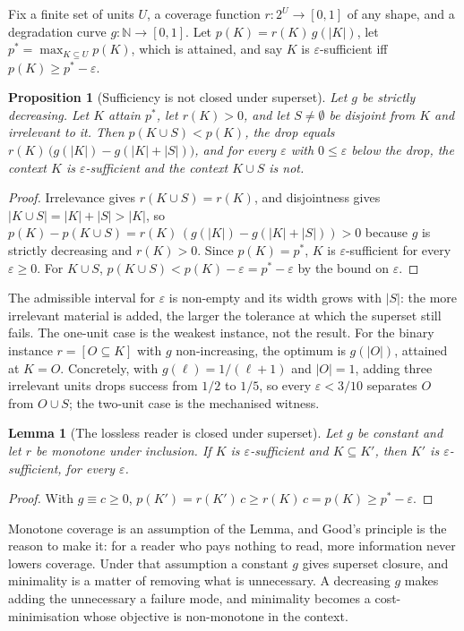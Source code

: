 \documentclass[10pt]{article}
\theoremstyle{definition}
\theoremstyle{plain}
\newtheorem{proposition}{Proposition}
\newtheorem{lemma}{Lemma}
\theoremstyle{remark}
\newcommand{\eps}{\varepsilon}
\begin{document}
Fix a finite set of units $U$, a coverage function $r : 2^U \to [0,1]$ of any shape, and a degradation curve $g : \mathbb{N} \to [0,1]$. Let $p(K) = r(K)\, g(|K|)$, let $p^* = \max_{K \subseteq U} p(K)$, which is attained, and say $K$ is $\eps$-sufficient iff $p(K) \geq p^* - \eps$.

\begin{proposition}[Sufficiency is not closed under superset]\label{prop:nonmono}
Let $g$ be strictly decreasing. Let $K$ attain $p^*$, let $r(K) > 0$, and let $S \neq \emptyset$ be disjoint from $K$ and irrelevant to it. Then $p(K \cup S) < p(K)$, the drop equals $r(K)\,\big(g(|K|) - g(|K|+|S|)\big)$, and for every $\eps$ with $0 \leq \eps$ below the drop, the context $K$ is $\eps$-sufficient and the context $K \cup S$ is not.
\end{proposition}
\begin{proof}
Irrelevance gives $r(K \cup S) = r(K)$, and disjointness gives $|K \cup S| = |K| + |S| > |K|$, so $p(K) - p(K \cup S) = r(K)\,(g(|K|) - g(|K|+|S|)) > 0$ because $g$ is strictly decreasing and $r(K) > 0$. Since $p(K) = p^*$, $K$ is $\eps$-sufficient for every $\eps \geq 0$. For $K \cup S$, $p(K \cup S) < p(K) - \eps = p^* - \eps$ by the bound on $\eps$.
\end{proof}

The admissible interval for $\eps$ is non-empty and its width grows with $|S|$: the more irrelevant material is added, the larger the tolerance at which the superset still fails. The one-unit case is the weakest instance, not the result. For the binary instance $r = [O \subseteq K]$ with $g$ non-increasing, the optimum is $g(|O|)$, attained at $K = O$. Concretely, with $g(\ell) = 1/(\ell+1)$ and $|O| = 1$, adding three irrelevant units drops success from $1/2$ to $1/5$, so every $\eps < 3/10$ separates $O$ from $O \cup S$; the two-unit case is the mechanised witness.

\begin{lemma}[The lossless reader is closed under superset]\label{lem:lossless}
Let $g$ be constant and let $r$ be monotone under inclusion. If $K$ is $\eps$-sufficient and $K \subseteq K'$, then $K'$ is $\eps$-sufficient, for every $\eps$.
\end{lemma}
\begin{proof}
With $g \equiv c \geq 0$, $p(K') = r(K')\,c \geq r(K)\,c = p(K) \geq p^* - \eps$.
\end{proof}

Monotone coverage is an assumption of the Lemma, and Good's principle is the reason to make it: for a reader who pays nothing to read, more information never lowers coverage. Under that assumption a constant $g$ gives superset closure, and minimality is a matter of removing what is unnecessary. A decreasing $g$ makes adding the unnecessary a failure mode, and minimality becomes a cost-minimisation whose objective is non-monotone in the context.
\end{document}
